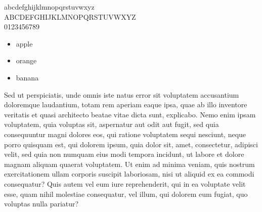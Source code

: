 \documentclass[12pt]{article}
\begin{document}
%
\noindent abcdefghijklmnopqrstuvwxyz \\[1em]
ABCDEFGHIJKLMNOPQRSTUVWXYZ \\[1em]
0123456789
%
\begin{itemize}
\item apple
\item orange
\item banana
\end{itemize}
%
Sed ut perspiciatis, unde omnis iste natus error sit voluptatem accusantium doloremque laudantium,
totam rem aperiam eaque ipsa, quae ab illo inventore veritatis et quasi architecto beatae vitae
dicta sunt, explicabo. Nemo enim ipsam voluptatem, quia voluptas sit, aspernatur aut odit aut fugit,
sed quia consequuntur magni dolores eos, qui ratione voluptatem sequi nesciunt, neque porro quisquam
est, qui dolorem ipsum, quia dolor sit, amet, consectetur, adipisci velit, sed quia non numquam eius
modi tempora incidunt, ut labore et dolore magnam aliquam quaerat voluptatem. Ut enim ad minima
veniam, quis nostrum exercitationem ullam corporis suscipit laboriosam, nisi ut aliquid ex ea
commodi consequatur? Quis autem vel eum iure reprehenderit, qui in ea voluptate velit esse, quam
nihil molestiae consequatur, vel illum, qui dolorem eum fugiat, quo voluptas nulla pariatur?
%
\end{document}
